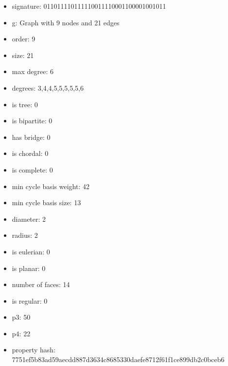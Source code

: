 \newpage
\begin{figure}
\end{figure}
\begin{itemize}
\item signature: 011011110111110011110001100001001011
\item g: Graph with 9 nodes and 21 edges
\item order: 9
\item size: 21
\item max degree: 6
\item degrees: 3,4,4,5,5,5,5,5,6
\item is tree: 0
\item is bipartite: 0
\item has bridge: 0
\item is chordal: 0
\item is complete: 0
\item min cycle basis weight: 42
\item min cycle basis size: 13
\item diameter: 2
\item radius: 2
\item is eulerian: 0
\item is planar: 0
\item number of faces: 14
\item is regular: 0
\item p3: 50
\item p4: 22
\item property hash: 7751ef5b83ad59aecdd887d3634c8685330daefe8712f61f1ce899db2c0bceb6
\end{itemize}
